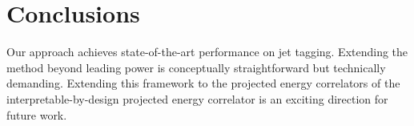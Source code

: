 \section{Conclusions}\label{sec:conclusions}

Our approach achieves state-of-the-art performance on jet tagging.
Extending the method beyond leading power is conceptually
straightforward but technically demanding. Extending this framework to
the projected energy correlators of the interpretable-by-design
projected energy correlator is an exciting direction for future work.

